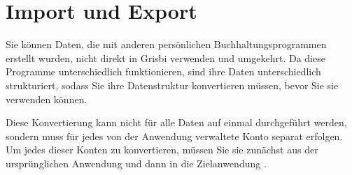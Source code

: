 

\chapter{Import und Export\label{importexport}}%

Sie können Daten, die mit anderen persönlichen Buchhaltungsprogrammen erstellt wurden, nicht direkt in Grisbi verwenden und umgekehrt. Da diese Programme unterschiedlich funktionieren, sind ihre Daten unterschiedlich strukturiert, sodass Sie ihre Datenstruktur konvertieren müssen, bevor Sie sie verwenden können.

Diese Konvertierung kann nicht für alle Daten auf einmal durchgeführt werden, sondern muss für jedes von der Anwendung verwaltete Konto separat erfolgen. Um jedes dieser Konten zu konvertieren, müssen Sie sie zunächst aus der ursprünglichen Anwendung  und dann in die Zielanwendung .

